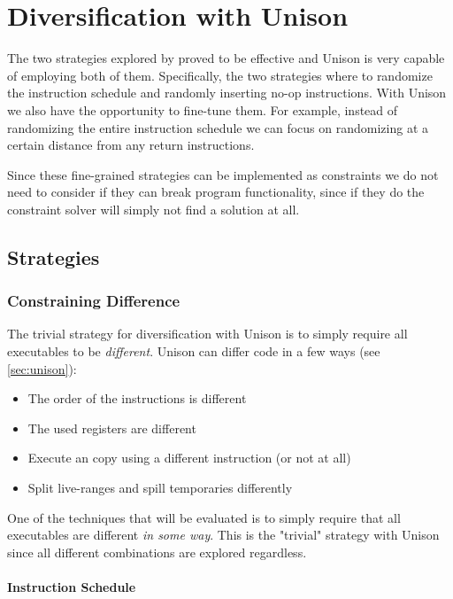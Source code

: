 \chapter{Diversification with Unison}

The two strategies explored by \textcite{large-scale-automated} proved to be
effective and Unison is very capable of employing both of them. Specifically, the two
strategies where to randomize the instruction schedule and randomly inserting no-op
instructions. With Unison we also have the opportunity to fine-tune them. For example,
instead of randomizing the entire instruction schedule we can focus on randomizing at a
certain distance from any return instructions.

Since these fine-grained strategies can be implemented as constraints we do not need to
consider if they can break program functionality, since if they do the constraint solver
will simply not find a solution at all.

\section{Strategies}

\subsection{Constraining Difference}

The trivial strategy for diversification with Unison is to simply require all executables
to be \textit{different}. Unison can differ code in a few ways (see \ref{sec:unison}):

\begin{itemize}
	\item The order of the instructions is different
	\item The used registers are different
	\item Execute an copy using a different instruction (or not at all)
	\item Split live-ranges and spill temporaries differently
\end{itemize}

One of the techniques that will be evaluated is to simply require that all executables
are different \textit{in some way}. This is the "trivial" strategy with Unison since all different combinations are explored regardless.

\subsubsection{Instruction Schedule}

